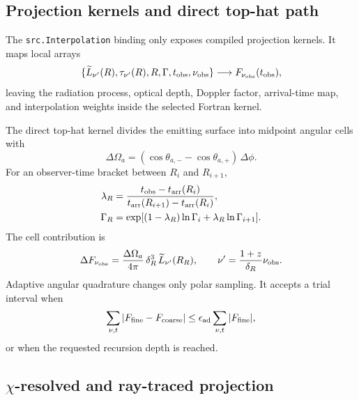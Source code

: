 \documentclass[twocolumn]{aastex702}
\begin{document}
\subsection{Projection kernels and direct top-hat path}

The \texttt{src.Interpolation} binding only exposes compiled projection kernels.
It maps local arrays
\begin{equation}
\{\widetilde L_{\nu'}(R),\tau_{\nu'}(R),R,\Gamma,t_{\rm obs},\nu_{\rm obs}\}
\longrightarrow F_{\nu_{\rm obs}}(t_{\rm obs}),
\end{equation}
leaving the radiation process, optical depth, Doppler factor, arrival-time map,
and interpolation weights inside the selected Fortran kernel.

The direct top-hat kernel divides the emitting surface into midpoint angular
cells with
\begin{equation}
\Delta\Omega_a=
(\cos\theta_{a,-}-\cos\theta_{a,+})\,\Delta\phi .
\end{equation}
For an observer-time bracket between \(R_i\) and \(R_{i+1}\),
\begin{equation}
\begin{aligned}
\lambda_R&=\frac{t_{\rm obs}-t_{\rm arr}(R_i)}
{t_{\rm arr}(R_{i+1})-t_{\rm arr}(R_i)},\\
\Gamma_R&=\exp[(1-\lambda_R)\ln\Gamma_i+\lambda_R\ln\Gamma_{i+1}].
\end{aligned}
\end{equation}
The cell contribution is
\begin{equation}
\Delta F_{\nu_{\rm obs}}=
\frac{\Delta\Omega_a}{4\pi}\,
\delta_R^3\,\widetilde L_{\nu'}(R_R),
\qquad
\nu'=\frac{1+z}{\delta_R}\nu_{\rm obs}.
\end{equation}
Adaptive angular quadrature changes only polar sampling.  It accepts a trial
interval when
\begin{equation}
\sum_{\nu,t}|F_{\rm fine}-F_{\rm coarse}|
\le \epsilon_{\rm ad}\sum_{\nu,t}|F_{\rm fine}|,
\end{equation}
or when the requested recursion depth is reached.

\subsection{\texorpdfstring{\(\chi\)}{chi}-resolved and ray-traced projection}
\end{document}
